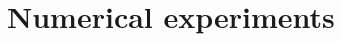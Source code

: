 \documentclass[1p]{elsarticle}
\newcommand{\code}[1]{\lstinline|#1|}
\newcommand{\figref}[1]{Fig.~\ref{#1}}
\begin{document}
%
%

\section{Numerical experiments}
\end{document}
